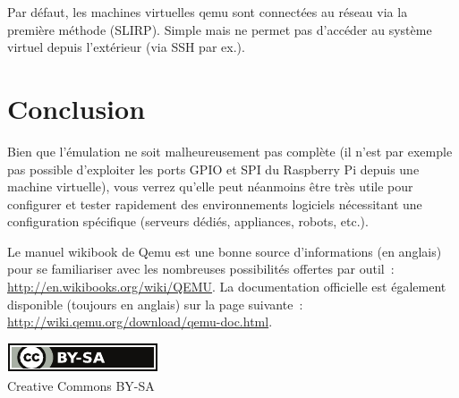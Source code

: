\documentclass{article}
\begin{document}
Par défaut, les machines virtuelles qemu sont connectées au réseau via la
première méthode (SLIRP).
Simple mais ne permet pas d'accéder au système virtuel depuis l'extérieur (via
SSH par ex.).


\section*{Conclusion}\label{sec:ccl}


Bien que l'émulation ne soit malheureusement pas complète (il n'est par exemple
pas possible d'exploiter les ports GPIO et SPI du Raspberry Pi depuis une
machine virtuelle), vous verrez qu'elle peut néanmoins être très utile pour
configurer et tester rapidement des environnements logiciels nécessitant une
configuration spécifique (serveurs dédiés, appliances, robots, etc.).
 
Le manuel wikibook de Qemu est une bonne source d'informations (en anglais)
pour se familiariser avec les nombreuses possibilités offertes par outil~:
\url{http://en.wikibooks.org/wiki/QEMU}.
La documentation officielle est également disponible (toujours en anglais) sur
la page suivante~: \url{http://wiki.qemu.org/download/qemu-doc.html}.



\nocite{*}                    %




\ifpdf
    \vfill %
    \begin{center}
        \href{http://creativecommons.org/licenses/by-sa/4.0/}{\includegraphics[width=.15\linewidth]{fig/cc_by_sa_small}}\\
        \small{Creative Commons BY-SA}
    \end{center}
\else
\end{document}
